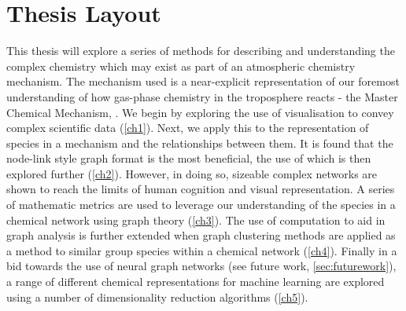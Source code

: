 
\section{Thesis Layout}
This thesis will explore a series of methods for describing and understanding the complex chemistry which may exist as part of an atmospheric chemistry mechanism. The mechanism used is a near-explicit representation of our foremost understanding of how gas-phase chemistry in the troposphere reacts - the Master Chemical Mechanism, \citep{mcm}.
We begin by exploring the use of visualisation to convey complex scientific data (\autoref{ch1}). Next, we apply this to the representation of species in a mechanism and the relationships between them. It is found that the node-link style graph format is the most beneficial, the use of which is then explored further (\autoref{ch2}).
However, in doing so, sizeable complex networks are shown to reach the limits of human cognition and visual representation. A series of mathematic metrics are used to leverage our understanding of the species in a chemical network using graph theory (\autoref{ch3}). The use of computation to aid in graph analysis is further extended when graph clustering methods are applied as a method to similar group species within a chemical network (\autoref{ch4}). Finally in a bid towards the use of neural graph networks (see future work, \autoref{sec:futurework}), a range of different chemical representations for machine learning are explored using a number of dimensionality reduction algorithms (\autoref{ch5}).
